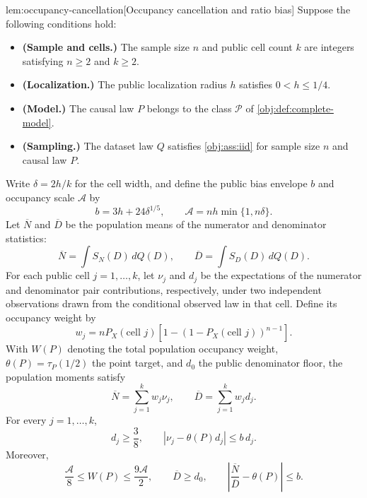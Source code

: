 \documentclass[11pt]{article}
\begin{document}
\begin{lemmav}{lem:occupancy-cancellation}[Occupancy cancellation and ratio bias]
Suppose the following conditions hold:
\begin{itemize}
\item \textbf{(Sample and cells.)} The sample size \(n\) and public cell count \(k\) are integers satisfying \(n\ge 2\) and \(k\ge 2\).
\item \textbf{(Localization.)} The public localization radius \(h\) satisfies \(0<h\le 1/4\).
\item \textbf{(Model.)} The causal law \(P\) belongs to the class \(\mathcal P\) of \cref{obj:def:complete-model}.
\item \textbf{(Sampling.)} The dataset law \(Q\) satisfies \cref{obj:ass:iid} for sample size \(n\) and causal law \(P\).
\end{itemize}
Write \(\delta=2h/k\) for the cell width, and define the public bias envelope \(b\) and occupancy scale \(\mathcal A\) by
\[
b=3h+24\delta^{1/5},
\qquad
\mathcal A=nh\min\{1,n\delta\}.
\]
Let \(\overline N\) and \(\overline D\) be the population means of the numerator and denominator statistics:
\[
\overline N=\int S_N(D)\,dQ(D),
\qquad
\overline D=\int S_D(D)\,dQ(D).
\]
For each public cell \(j=1,\ldots,k\), let \(\nu_j\) and \(d_j\) be the expectations of the numerator and denominator pair contributions, respectively, under two independent observations drawn from the conditional observed law in that cell. Define its occupancy weight by
\[
w_j
=
nP_X(\text{cell }j)
\left[1-\left(1-P_X(\text{cell }j)\right)^{n-1}\right].
\]
With \(W(P)\) denoting the total population occupancy weight, \(\theta(P)=\tau_P(1/2)\) the point target, and \(d_0\) the public denominator floor, the population moments satisfy
\[
\overline N=\sum_{j=1}^{k}w_j\nu_j,
\qquad
\overline D=\sum_{j=1}^{k}w_jd_j.
\]
For every \(j=1,\ldots,k\),
\[
d_j\ge\frac38,
\qquad
\left|\nu_j-\theta(P)d_j\right|\le b\,d_j.
\]
Moreover,
\[
\frac{\mathcal A}{8}\le W(P)\le\frac{9\mathcal A}{2},
\qquad
\overline D\ge d_0,
\qquad
\left|\frac{\overline N}{\overline D}-\theta(P)\right|\le b.
\]
\end{lemmav}
\end{document}
